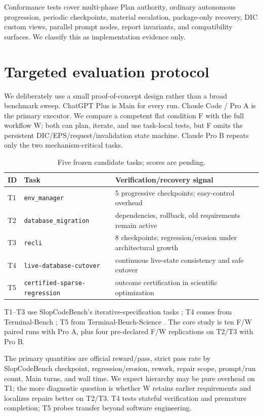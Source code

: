\documentclass{article}
\begin{document}
Conformance tests cover multi-phase Plan authority, ordinary autonomous progression, periodic checkpoints, material escalation, package-only recovery, DIC custom views, parallel prompt nodes, report invariants, and compatibility surfaces. We classify this as implementation evidence only.

\section{Targeted evaluation protocol}
We deliberately use a small proof-of-concept design rather than a broad benchmark sweep. ChatGPT Plus is Main for every run. Claude Code / Pro A is the primary executor. We compare a competent flat condition F with the full workflow W; both can plan, iterate, and use task-local tests, but F omits the persistent DIC/EPS/request/invalidation state machine. Claude Pro B repeats only the two mechanism-critical tasks.

\begin{table}[t]
\centering\small
\caption{Five frozen candidate tasks; scores are pending.}
\begin{tabularx}{\linewidth}{@{}l l X@{}}
\toprule
ID & Task & Verification/recovery signal\\\midrule
T1 & \texttt{env\_manager} & 5 progressive checkpoints; easy-control overhead\\
T2 & \texttt{database\_migration} & dependencies, rollback, old requirements remain active\\
T3 & \texttt{recli} & 8 checkpoints; regression/erosion under architectural growth\\
T4 & \texttt{live-database-cutover} & continuous live-state consistency and safe cutover\\
T5 & \texttt{certified-sparse-regression} & outcome certification in scientific optimization\\
\bottomrule
\end{tabularx}
\end{table}

T1--T3 use SlopCodeBench's iterative-specification tasks \citep{orlanski2026slopcodebench}; T4 comes from Terminal-Bench \citep{merrill2026terminalbench}; T5 from Terminal-Bench-Science \citep{terminalbenchscience2026}. The core study is ten F/W paired runs with Pro A, plus four pre-declared F/W replications on T2/T3 with Pro B.

The primary quantities are official reward/pass, strict pass rate by SlopCodeBench checkpoint, regression/erosion, rework, repair scope, prompt/run count, Main turns, and wall time. We expect hierarchy may be pure overhead on T1; the more diagnostic question is whether W retains earlier requirements and localizes repairs better on T2/T3. T4 tests stateful verification and premature completion; T5 probes transfer beyond software engineering.
\end{document}
